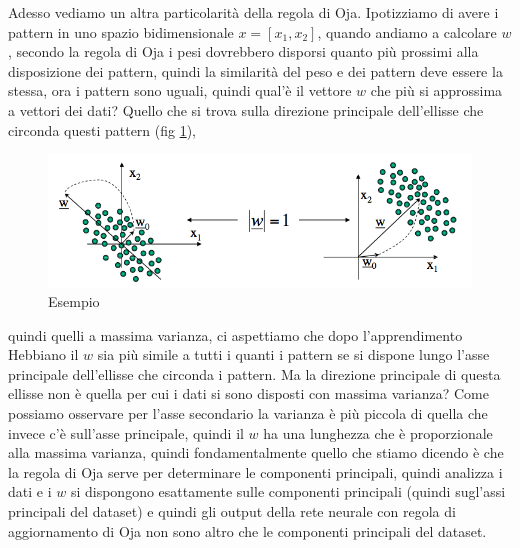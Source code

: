 \noindent Adesso vediamo un altra particolarità della regola di Oja. Ipotizziamo di avere i pattern in uno spazio bidimensionale $x = [x_1, x_2]$, quando andiamo a calcolare $w$, secondo la regola di Oja i pesi dovrebbero disporsi quanto più prossimi alla disposizione dei pattern, quindi la similarità del peso e dei pattern deve essere la stessa, ora i pattern sono uguali, quindi qual'è il vettore $w$ che più si approssima a vettori dei dati? Quello che si trova sulla direzione principale dell'ellisse che circonda questi pattern (fig \ref{pattern}), 
\begin{figure}
\centering
\includegraphics[scale=0.5]{img/pattern.png}
\caption{Esempio}
\label{pattern}
\end{figure}
quindi quelli a massima varianza, ci aspettiamo che dopo l'apprendimento Hebbiano il $w$ sia più simile a tutti i quanti i pattern se si dispone lungo l'asse principale dell'ellisse che circonda i pattern. Ma la direzione principale di questa ellisse non è quella per cui i dati si sono disposti con massima varianza? Come possiamo osservare per l'asse secondario la varianza è più piccola di quella che invece c'è sull'asse principale, quindi il $w$ ha una lunghezza che è proporzionale alla massima varianza, quindi fondamentalmente quello che stiamo dicendo è che la regola di Oja serve per determinare le componenti principali, quindi analizza i dati e i $w$ si dispongono esattamente sulle componenti principali (quindi sugl'assi principali del dataset) e quindi gli output della rete neurale con regola di aggiornamento di Oja non sono altro che le componenti principali del dataset.

